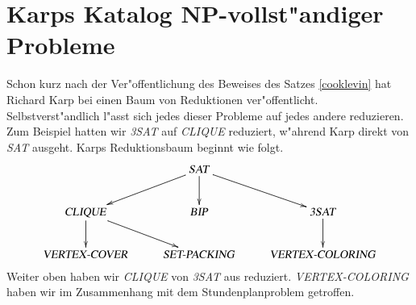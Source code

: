 %
%
%
%

\section{Karps Katalog NP-vollst"andiger Probleme}
Schon kurz nach der Ver"offentlichung des Beweises des Satzes
\ref{cooklevin} hat Richard Karp bei einen Baum von Reduktionen
ver"offentlicht.
Selbstverst"andlich l"asst
sich jedes dieser Probleme auf jedes andere reduzieren. Zum Beispiel
hatten wir \textsl{3SAT} auf \textsl{CLIQUE} reduziert, w"ahrend
Karp direkt von \textsl{SAT} ausgeht. Karps Reduktionsbaum
beginnt wie folgt.
\[
\xymatrix{
{}
	&\text{\textsl{SAT}} \ar[dl] \ar[d] \ar[dr]
\\
\text{\textsl{CLIQUE}} \ar[d] \ar[dr]
	&\text{\textsl{BIP}}
		&\text{\textsl{3SAT}} \ar[d]
\\
\text{\textsl{VERTEX-COVER}}
	&\text{\textsl{SET-PACKING}}
		&\text{\textsl{VERTEX-COLORING}}
}
\]
Weiter oben haben wir \textsl{CLIQUE} von \textsl{3SAT} aus
reduziert. \textsl{VERTEX-COLORING} haben wir im Zusammenhang
mit dem Stundenplanproblem getroffen.

